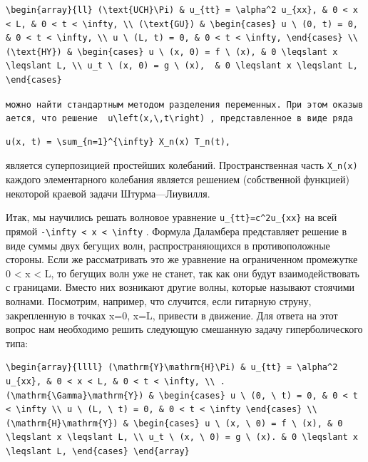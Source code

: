 \documentclass[
  ukrainian,
]{article}
\begin{document}
\begin{verbatim}
\begin{array}{ll} (\text{UCH}\Pi) & u_{tt} = \alpha^2 u_{xx}, & 0 < x < L, & 0 < t < \infty, \\ (\text{GU}) & \begin{cases} u \ (0, t) = 0, & 0 < t < \infty, \\ u \ (L, t) = 0, & 0 < t < \infty, \end{cases} \\ (\text{HY}) & \begin{cases} u \ (x, 0) = f \ (x), & 0 \leqslant x \leqslant L, \\ u_t \ (x, 0) = g \ (x),  & 0 \leqslant x \leqslant L, \end{cases}
\end{verbatim}

\texttt{можно\ найти\ стандартным\ методом\ разделения\ переменных.\ При\ этом\ оказывается,\ что\ решение\ \ \textquotesingle{}u\textbackslash{}left(x,\textbackslash{},t\textbackslash{}right)\textquotesingle{}\ ,\ представленное\ в\ виде\ ряда}

\begin{verbatim}
u(x, t) = \sum_{n=1}^{\infty} X_n(x) T_n(t),
\end{verbatim}

является суперпозицией простейших колебаний. Пространственная часть
\texttt{X\_n(x)} каждого элементарного колебания является решением
(собственной функцией) некоторой краевой задачи Штурма---Лиувилля.

Итак, мы научились решать волновое уравнение
\texttt{u\_\{tt\}=c\^{}2u\_\{xx\}} на всей прямой
\texttt{-\textbackslash{}infty\ \textless{}\ x\ \textless{}\ \textbackslash{}infty}
. Формула Даламбера представляет решение в виде суммы двух бегущих волн,
распространяющихся в противоположные стороны. Если же рассматривать это
же уравнение на ограниченном промежутке 0 \textless{} x \textless{} L,
то бегущих волн уже не станет, так как они будут взаимодействовать с
границами. Вместо них возникают другие волны, которые называют стоячими
волнами. Посмотрим, например, что случится, если гитарную струну,
закрепленную в точках x=0, x=L, привести в движение. Для ответа на этот
вопрос нам необходимо решить следующую смешанную задачу гиперболического
типа:

\begin{verbatim}
\begin{array}{llll} (\mathrm{Y}\mathrm{H}\Pi) & u_{tt} = \alpha^2 u_{xx}, & 0 < x < L, & 0 < t < \infty, \\ . (\mathrm{\Gamma}\mathrm{Y}) & \begin{cases} u \ (0, \ t) = 0, & 0 < t < \infty \\ u \ (L, \ t) = 0, & 0 < t < \infty \end{cases} \\ (\mathrm{H}\mathrm{Y}) & \begin{cases} u \ (x, \ 0) = f \ (x), & 0 \leqslant x \leqslant L, \\ u_t \ (x, \ 0) = g \ (x). & 0 \leqslant x \leqslant L, \end{cases} \end{array}
\end{verbatim}
\end{document}
